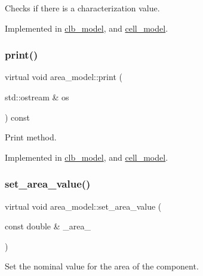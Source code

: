 Checks if there is a characterization value. 



Implemented in \hyperlink{classclb__model_a409409e7c08050412c0153d376ce50ec}{clb\+\_\+model}, and \hyperlink{classcell__model_a96569fa865d6362be6e405ca34a46205}{cell\+\_\+model}.

\mbox{\label{classarea__model_abdb74eba19254bd8c2098c006aef673c}} 
\subsubsection{\texorpdfstring{print()}{print()}}
{\footnotesize\ttfamily virtual void area\+\_\+model\+::print (\begin{DoxyParamCaption}\item[{std\+::ostream \&}]{os }\end{DoxyParamCaption}) const\hspace{0.3cm}{\ttfamily [pure virtual]}}



Print method. 



Implemented in \hyperlink{classclb__model_ab65361824b8e850bc109193b5aab23c5}{clb\+\_\+model}, and \hyperlink{classcell__model_a3b924669e2a19f7891151c235b83c060}{cell\+\_\+model}.

\mbox{\label{classarea__model_a7c533a6a1b352493c04980d0734f89e5}} 
\subsubsection{\texorpdfstring{set\+\_\+area\+\_\+value()}{set\_area\_value()}}
{\footnotesize\ttfamily virtual void area\+\_\+model\+::set\+\_\+area\+\_\+value (\begin{DoxyParamCaption}\item[{const double \&}]{\+\_\+area\+\_\+ }\end{DoxyParamCaption})\hspace{0.3cm}{\ttfamily [pure virtual]}}



Set the nominal value for the area of the component. 



